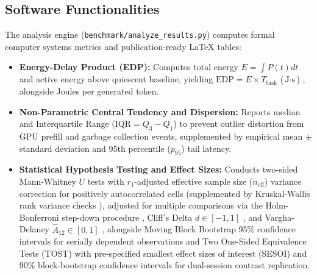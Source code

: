 \documentclass[preprint,12pt,3p]{elsarticle}
\begin{document}
\subsection{Software Functionalities}
The analysis engine (\texttt{benchmark/analyze\_results.py}) computes formal computer systems metrics and publication-ready LaTeX tables:
\begin{itemize}
    \item \textbf{Energy-Delay Product (EDP):} Computes total energy $E = \int P(t) dt$ and active energy above quiescent baseline, yielding $\text{EDP} = E \times T_{\text{task}}$ ($\text{J}\cdot\text{s}$) \cite{barroso2007case, you2023zeus}, alongside Joules per generated token.
    \item \textbf{Non-Parametric Central Tendency and Dispersion:} Reports median and Interquartile Range ($\text{IQR} = Q_3 - Q_1$) to prevent outlier distortion from GPU prefill and garbage collection events, supplemented by empirical mean $\pm$ standard deviation and 95th percentile ($p_{95}$) tail latency.
    \item \textbf{Statistical Hypothesis Testing and Effect Sizes:} Conducts two-sided Mann-Whitney $U$ tests \cite{mann1947test} with $r_1$-adjusted effective sample size ($n_{\text{eff}}$) variance correction for positively autocorrelated cells \cite{bayley1946effective, yue2004mann, zimmerman1993rank, fagerland2009wilcoxon} (supplemented by Kruskal-Wallis rank variance checks \cite{kruskal1952use}), adjusted for multiple comparisons via the Holm-Bonferroni step-down procedure \cite{holm1979simple}, Cliff's Delta $d \in [-1, 1]$ \cite{cliff1993dominance}, and Vargha-Delaney $\hat{A}_{12} \in [0, 1]$ \cite{vargha2000critique}, alongside Moving Block Bootstrap 95\% confidence intervals for serially dependent observations \cite{kuensch1989jackknife} and Two One-Sided Equivalence Tests (TOST) with pre-specified smallest effect sizes of interest (SESOI) and 90\% block-bootstrap confidence intervals \cite{schuirmann1987comparison, lakens2017equivalence} for dual-session contrast replication.
\end{itemize}
\end{document}
